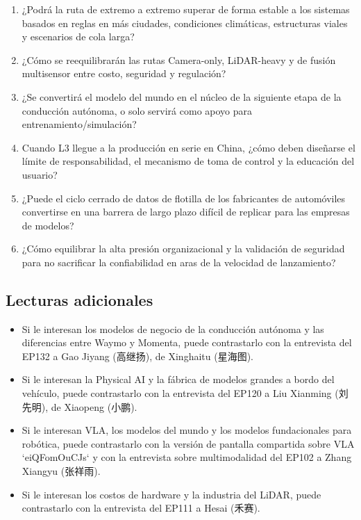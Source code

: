 \begin{enumerate}
\item ¿Podrá la ruta de extremo a extremo superar de forma estable a los sistemas basados en reglas en más ciudades, condiciones climáticas, estructuras viales y escenarios de cola larga?
\item ¿Cómo se reequilibrarán las rutas Camera-only, LiDAR-heavy y de fusión multisensor entre costo, seguridad y regulación?
\item ¿Se convertirá el modelo del mundo en el núcleo de la siguiente etapa de la conducción autónoma, o solo servirá como apoyo para entrenamiento/simulación?
\item Cuando L3 llegue a la producción en serie en China, ¿cómo deben diseñarse el límite de responsabilidad, el mecanismo de toma de control y la educación del usuario?
\item ¿Puede el ciclo cerrado de datos de flotilla de los fabricantes de automóviles convertirse en una barrera de largo plazo difícil de replicar para las empresas de modelos?
\item ¿Cómo equilibrar la alta presión organizacional y la validación de seguridad para no sacrificar la confiabilidad en aras de la velocidad de lanzamiento?
\end{enumerate}

\subsection{Lecturas adicionales}

\begin{itemize}
\item Si le interesan los modelos de negocio de la conducción autónoma y las diferencias entre Waymo y Momenta, puede contrastarlo con la entrevista del EP132 a Gao Jiyang (高继扬), de Xinghaitu (星海图).
\item Si le interesan la Physical AI y la fábrica de modelos grandes a bordo del vehículo, puede contrastarlo con la entrevista del EP120 a Liu Xianming (刘先明), de Xiaopeng (小鹏).
\item Si le interesan VLA, los modelos del mundo y los modelos fundacionales para robótica, puede contrastarlo con la versión de pantalla compartida sobre VLA `eiQFomOuCJs` y con la entrevista sobre multimodalidad del EP102 a Zhang Xiangyu (张祥雨).
\item Si le interesan los costos de hardware y la industria del LiDAR, puede contrastarlo con la entrevista del EP111 a Hesai (禾赛).
\end{itemize}


